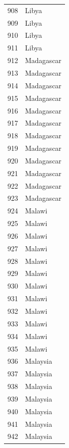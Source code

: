 \documentclass[
  letterpaper,
  DIV=11,
  numbers=noendperiod]{scrreprt}
\begin{document}
\begin{tabular}{ll}
908  &                     Libya \\
909  &                     Libya \\
910  &                     Libya \\
911  &                     Libya \\
912  &                Madagascar \\
913  &                Madagascar \\
914  &                Madagascar \\
915  &                Madagascar \\
916  &                Madagascar \\
917  &                Madagascar \\
918  &                Madagascar \\
919  &                Madagascar \\
920  &                Madagascar \\
921  &                Madagascar \\
922  &                Madagascar \\
923  &                Madagascar \\
924  &                    Malawi \\
925  &                    Malawi \\
926  &                    Malawi \\
927  &                    Malawi \\
928  &                    Malawi \\
929  &                    Malawi \\
930  &                    Malawi \\
931  &                    Malawi \\
932  &                    Malawi \\
933  &                    Malawi \\
934  &                    Malawi \\
935  &                    Malawi \\
936  &                  Malaysia \\
937  &                  Malaysia \\
938  &                  Malaysia \\
939  &                  Malaysia \\
940  &                  Malaysia \\
941  &                  Malaysia \\
942  &                  Malaysia \\

\end{tabular}
\end{document}

